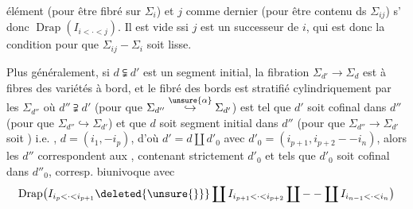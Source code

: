 élément (pour être fibré sur $\Sigma_i$) et $j$ comme dernier (pour être contenu ds $\Sigma_{ij}$) s' donc \inserted{$\simeq$} $\operatorname{Drap}(I_{i<\cdot<j})$. Il est vide ssi $j$ est un successeur de $i$, qui est donc la condition pour que $\Sigma_{ij}-\Sigma_i$ soit lisse.

Plus généralement, si $d\subsetneqq d'$ est un segment initial, la fibration $\Sigma_{d'}\longrightarrow\Sigma_d$ est à fibres des variétés à bord, et le fibré des bords est stratifié cylindriquement par les $\Sigma_{d''}$ où $d''\supsetneqq d'$ (pour que $\Sigma_{d''}\overset{\unsure{\alpha}}{\hookrightarrow}\Sigma_{d'}$) est tel que $d'$ soit cofinal dans $d''$ (pour que $\Sigma_{d''}\hookrightarrow\Sigma_{d'}$) et que $d$ soit segment initial dans $d''$ (pour que $\Sigma_{d''}\longrightarrow\Sigma_{d'}$ soit ) i.e.  , $d=(i_1,-i_p)$,  d'où $d'=d\coprod d'_0$  avec $d'_0=(i_{p+1},i_{p+2}--i_n)$, alors les $d''$ correspondent aux
, contenant  strictement $d'_0$ et tels que $d'_0$ soit cofinal dans $d''_0$,   corresp. biunivoque avec
\[
\operatorname{Drap}\bigl(I_{i_p<\cdot<i_{p+1}}\deleted{\unsure{\}}}\coprod I_{i_{p+1}<\cdot<i_{p+2}}\coprod--\coprod I_{i_{n-1}<\cdot<i_n}\bigr)
\]

